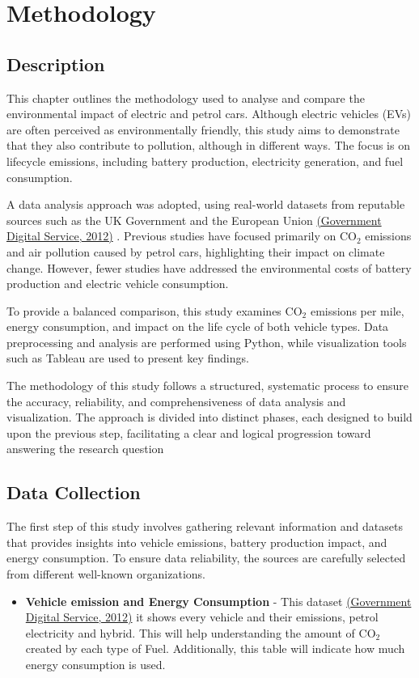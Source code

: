 \chapter{Methodology}
\label{ch:method} %

\section{Description}

This chapter outlines the methodology used to analyse and compare the environmental impact of electric and petrol cars.
 Although electric vehicles (EVs) are often perceived as environmentally friendly,
 this study aims to demonstrate that they also contribute to pollution, although in different ways.
 The focus is on lifecycle emissions, including battery production, electricity generation, and fuel consumption.

A data analysis approach was adopted, using real-world datasets from
reputable sources such as the UK Government and the European Union \href{https://www.gov.uk/co2-and-vehicle-tax-tools}{(Government Digital Service, 2012)} . Previous studies have focused primarily on CO$_2$ emissions and air pollution caused by petrol cars, highlighting their impact on climate change.
 However, fewer studies have addressed the environmental costs of battery production and electric vehicle consumption.

To provide a balanced comparison, this study examines
CO$_2$ emissions per mile, energy consumption, and impact on the life cycle of both vehicle types.
Data preprocessing and analysis are performed using Python, while visualization tools such
as Tableau are used to present key findings. 

The methodology of this study follows a structured, systematic process to ensure the accuracy, reliability, and comprehensiveness of data analysis and visualization. The approach is divided into distinct phases, each designed to build upon the previous step, facilitating a clear and logical progression toward answering the research question
\clearpage

\section{Data Collection}
 The first step of this study involves gathering relevant information and datasets that provides insights into vehicle emissions, battery production impact, and energy consumption. To ensure data reliability, the sources are carefully selected from different well-known organizations. 
 \begin{itemize}
     \item \textbf{Vehicle emission and Energy Consumption} - This dataset \href{https://www.gov.uk/co2-and-vehicle-tax-tools}{(Government Digital Service, 2012)} it shows every vehicle and their emissions, petrol electricity and hybrid. This will help understanding the amount of CO$_2$ created by each type of Fuel. Additionally, this table will indicate how much energy consumption is used. 
 \end{itemize}

